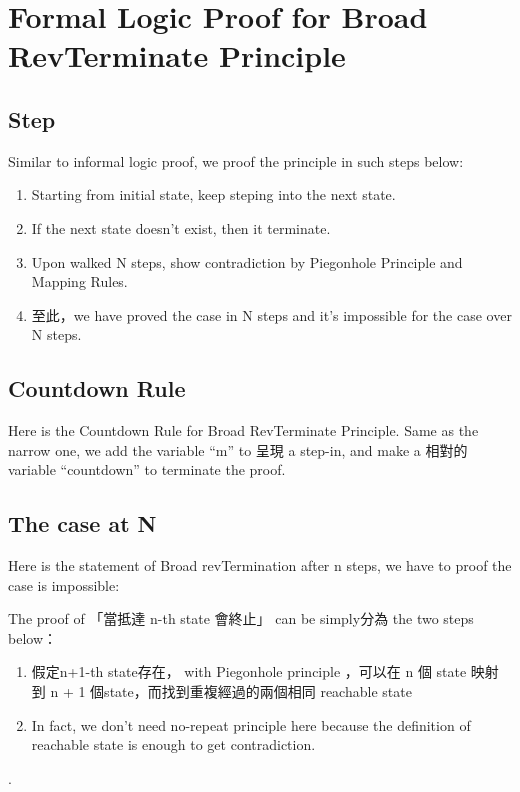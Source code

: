 \section{Formal Logic Proof for Broad RevTerminate Principle}

\subsection{ Step }


Similar to informal logic proof, we proof the principle in such steps below:
\begin{enumerate}[1.]
    \item Starting from initial state, keep steping into the next state.
    \item If the next state doesn't exist, then it terminate.
    \item Upon walked N steps, show contradiction by Piegonhole Principle and Mapping Rules.
    \item 至此，we have proved the case in N steps and it's impossible for the case over N steps.
\end{enumerate}

\subsection{ Countdown Rule }
Here is the Countdown Rule for Broad RevTerminate Principle.
Same as the narrow one, we add the variable ``m'' to 呈現 a step-in, and make a 相對的 variable ``countdown'' to terminate the proof.


\subsection{ The case at N }
Here is the statement of Broad revTermination after n steps, we have to proof the case is impossible:


The proof of 「當抵達 n-th state 會終止」 can be simply分為 the two steps below：
\begin{enumerate}[1.]
    \item 假定n+1-th state存在， with Piegonhole principle ，可以在 n 個 state 映射到 n + 1 個state，而找到重複經過的兩個相同 reachable state
    \item In fact, we don't need no-repeat principle here because the definition of reachable state is enough to get contradiction.
\end{enumerate}.

